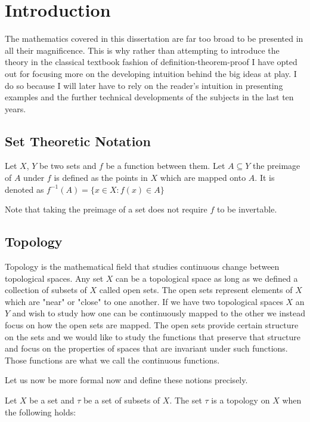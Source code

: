 \chapter{Introduction}
\label{chapter2}

The mathematics covered in this dissertation are far too broad to be presented in all their magnificence. This is why rather than attempting to introduce the theory in the classical textbook fashion of definition-theorem-proof I have opted out for focusing more on the developing intuition behind the big ideas at play. I do so because I will later have to rely on the reader's intuition in presenting examples and the further technical developments of the subjects in the last ten years. 

\section{Set Theoretic Notation}


\begin{defn} Let $X$, $Y$ be two sets and $f$ be a function between them. Let $A \subseteq Y$ the preimage of $A$ under $f$ is defined as the points in $X$ which are mapped onto $A$. It is denoted as $f^{-1}(A) = \{x \in X : f(x) \in A\}$  \end{defn}

Note that taking the preimage of a set does not require $f$ to be invertable.

\section{Topology}

Topology is the mathematical field that studies continuous change between topological spaces. Any set $X$ can be a topological space as long as we defined a collection of subsets of $X$ called open sets. The open sets represent elements of $X$ which are "near" or "close" to one another. If we have two topological spaces $X$ an $Y$ and wish to study how one can be continuously mapped to the other we instead focus on how the open sets are mapped. The open sets provide certain structure on the sets and we would like to study the functions that preserve that structure and focus on the properties of spaces that are invariant under such functions. Those functions are what we call the continuous functions.

Let us now be more formal now and define these notions precisely.

\begin{defn} Let $X$ be a set and $\tau$ be a set of subsets of $X$. The set $\tau$ is a topology on $X$ when the following holds:  \end{defn}


